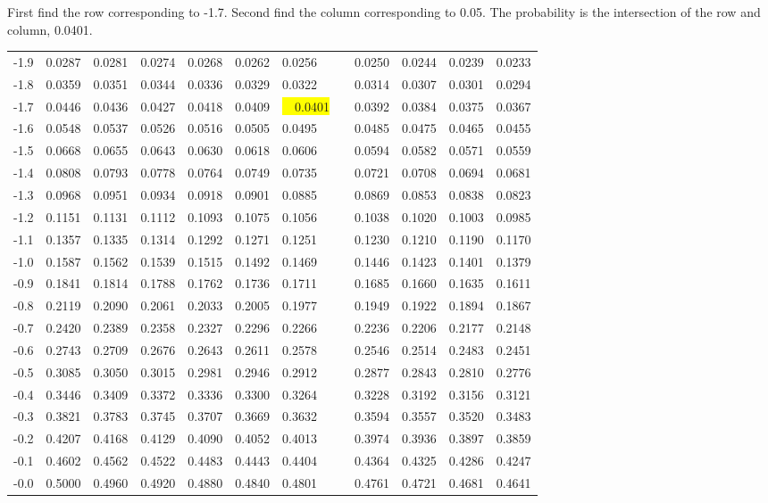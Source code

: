 \begin{frame} {\small First find the row corresponding to -1.7. Second
    find the column corresponding to 0.05. The probability is the
    intersection of the row and column, 0.0401.}
{\begin{tabular}{l|lllll>{\columncolor{blue}}lllll}
-1.9 & 0.0287 & 0.0281 & 0.0274 & 0.0268 & 0.0262 & 0.0256 & 0.0250 & 0.0244 & 0.0239 & 0.0233 \\ 
-1.8 & 0.0359 & 0.0351 & 0.0344 & 0.0336 & 0.0329 & 0.0322 & 0.0314 & 0.0307 & 0.0301 & 0.0294 \\ 
\rowcolor{red} -1.7 & 0.0446 & 0.0436 & 0.0427 & 0.0418 & 0.0409 & {\colorbox{yellow}{~~0.0401}~~} & 0.0392 & 0.0384 & 0.0375 & 0.0367 \\ 
-1.6 & 0.0548 & 0.0537 & 0.0526 & 0.0516 & 0.0505 & 0.0495 & 0.0485 & 0.0475 & 0.0465 & 0.0455 \\ 
-1.5 & 0.0668 & 0.0655 & 0.0643 & 0.0630 & 0.0618 & 0.0606 & 0.0594 & 0.0582 & 0.0571 & 0.0559 \\ 
-1.4 & 0.0808 & 0.0793 & 0.0778 & 0.0764 & 0.0749 & 0.0735 & 0.0721 & 0.0708 & 0.0694 & 0.0681 \\ 
-1.3 & 0.0968 & 0.0951 & 0.0934 & 0.0918 & 0.0901 & 0.0885 & 0.0869 & 0.0853 & 0.0838 & 0.0823 \\ 
-1.2 & 0.1151 & 0.1131 & 0.1112 & 0.1093 & 0.1075 & 0.1056 & 0.1038 & 0.1020 & 0.1003 & 0.0985 \\ 
-1.1 & 0.1357 & 0.1335 & 0.1314 & 0.1292 & 0.1271 & 0.1251 & 0.1230 & 0.1210 & 0.1190 & 0.1170 \\ 
-1.0 & 0.1587 & 0.1562 & 0.1539 & 0.1515 & 0.1492 & 0.1469 & 0.1446 & 0.1423 & 0.1401 & 0.1379 \\ 
-0.9 & 0.1841 & 0.1814 & 0.1788 & 0.1762 & 0.1736 & 0.1711 & 0.1685 & 0.1660 & 0.1635 & 0.1611 \\ 
-0.8 & 0.2119 & 0.2090 & 0.2061 & 0.2033 & 0.2005 & 0.1977 & 0.1949 & 0.1922 & 0.1894 & 0.1867 \\ 
-0.7 & 0.2420 & 0.2389 & 0.2358 & 0.2327 & 0.2296 & 0.2266 & 0.2236 & 0.2206 & 0.2177 & 0.2148 \\ 
-0.6 & 0.2743 & 0.2709 & 0.2676 & 0.2643 & 0.2611 & 0.2578 & 0.2546 & 0.2514 & 0.2483 & 0.2451 \\ 
-0.5 & 0.3085 & 0.3050 & 0.3015 & 0.2981 & 0.2946 & 0.2912 & 0.2877 & 0.2843 & 0.2810 & 0.2776 \\ 
-0.4 & 0.3446 & 0.3409 & 0.3372 & 0.3336 & 0.3300 & 0.3264 & 0.3228 & 0.3192 & 0.3156 & 0.3121 \\ 
-0.3 & 0.3821 & 0.3783 & 0.3745 & 0.3707 & 0.3669 & 0.3632 & 0.3594 & 0.3557 & 0.3520 & 0.3483 \\ 
-0.2 & 0.4207 & 0.4168 & 0.4129 & 0.4090 & 0.4052 & 0.4013 & 0.3974 & 0.3936 & 0.3897 & 0.3859 \\ 
-0.1 & 0.4602 & 0.4562 & 0.4522 & 0.4483 & 0.4443 & 0.4404 & 0.4364 & 0.4325 & 0.4286 & 0.4247 \\ 
-0.0 & 0.5000 & 0.4960 & 0.4920 & 0.4880 & 0.4840 & 0.4801 & 0.4761 & 0.4721 & 0.4681 & 0.4641 
\end{tabular}



}

\end{frame}




